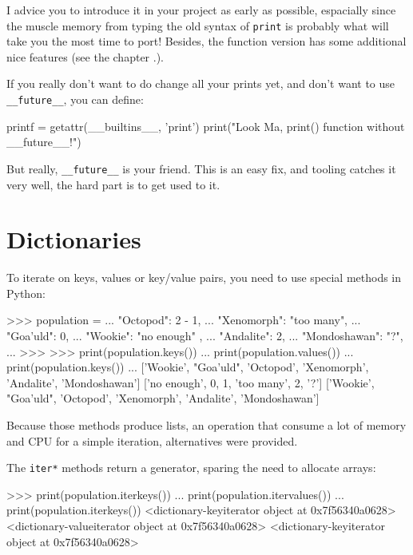 I advice you to introduce it in your project as early as possible, espacially since the muscle memory from typing the old syntax of \lstinline{print} is probably what will take you the most time to port! Besides, the function version has some additional nice features (see the chapter .).

If you really don't want to do change all your prints yet, and don't want to use \lstinline{__future__}, you can define:

\begin{py2and3}
printf = getattr(__builtins__, 'print')
print("Look Ma, print() function without __future__!")
\end{py2and3}

But really, \lstinline{__future__} is your friend. This is an easy fix, and tooling catches it very well, the hard part is to get used to it.


\section{Dictionaries}

To iterate on keys, values or key/value pairs, you need to use special methods in Python:

\begin{py2}
>>> population = {
...     "Octopod": 2 - 1,
...     "Xenomorph": "too many",
...     "Goa'uld": 0,
...     "Wookie": "no enough" ,
...     "Andalite": 2,
...     "Mondoshawan": "?",
... }
>>>
>>> print(population.keys())
... print(population.values())
... print(population.keys())
...
['Wookie', "Goa'uld", 'Octopod', 'Xenomorph', 'Andalite', 'Mondoshawan']
['no enough', 0, 1, 'too many', 2, '?']
['Wookie', "Goa'uld", 'Octopod', 'Xenomorph', 'Andalite', 'Mondoshawan']
\end{py2}

Because those methods produce lists, an operation that consume a lot of memory and CPU for a simple iteration, alternatives were provided.

The \lstinline{iter*} methods return a generator, sparing the need to allocate arrays:

\begin{py2}
>>> print(population.iterkeys())
... print(population.itervalues())
... print(population.iterkeys())
<dictionary-keyiterator object at 0x7f56340a0628>
<dictionary-valueiterator object at 0x7f56340a0628>
<dictionary-keyiterator object at 0x7f56340a0628>
\end{py2}


